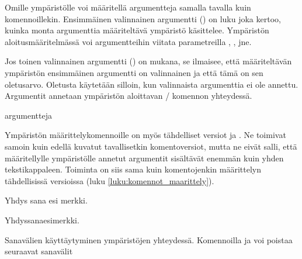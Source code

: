 Omille ympäristölle voi määritellä argumentteja samalla tavalla kuin
komennoillekin. Ensimmäinen valinnainen argumentti () on luku
joka kertoo, kuinka monta argumenttia määriteltävä ympäristö käsittelee.
Ympäristön aloitusmääritelmässä voi argumentteihin viitata parametreilla
, ,  jne.

Jos toinen valinnainen argumentti () on mukana, se
ilmaisee, että määriteltävän ympäristön ensimmäinen argumentti on
valinnainen ja että tämä on sen oletusarvo. Oletusta käytetään silloin,
kun valinnaista argumenttia ei ole annettu. Argumentit annetaan
ympäristön aloittavan \-/ komennon yhteydessä.

\begin{koodilohkosis}
\begin{ymp}[valinnainen]{argu}{mentteja}
\end{ymp}
\end{koodilohkosis}

Ympäristön määrittelykomennoille on myös tähdelliset versiot
 ja . Ne toimivat
samoin kuin edellä kuvatut tavallisetkin komentoversiot, mutta ne eivät
salli, että määritellylle ympäristölle annetut argumentit sisältävät
enemmän kuin yhden tekstikappaleen. Toiminta on siis sama kuin
komentojenkin määrittelyn tähdellisissä versioissa (luku
\ref{luku:komennot_maarittely}).

\begin{koodilohkosis}
\newenvironment*   {nimi}[n][oletus]{aloitus}{lopetus}
\renewenvironment* {nimi}[n][oletus]{aloitus}{lopetus}
\end{koodilohkosis}

\begin{esimerkki*}

\begin{koodilohko}
\newenvironment{ymp}
{Yhdys\ignorespaces}
{esi\ignorespacesafterend}

\begin{ymp}
  sana%
\end{ymp}   merkki.
\end{koodilohko}
\begin{tulos}
  Yhdyssanaesimerkki.
\end{tulos}
\caption{Sanavälien käyttäytyminen ympäristöjen yhteydessä. Komennoilla
   ja  voi poistaa
  seuraavat sanavälit}
\label{esim:ignorespacesafterend}
\end{esimerkki*}

